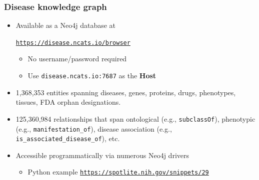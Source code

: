 ﻿\documentclass[anchorcolor=blue,linkcolor=blue]{beamer}
\begin{document}
\begin{frame}
  \frametitle{Disease knowledge graph}
  \begin{itemize}
  \item Available as a Neo4j database at
    
    \centerline{\href{https://disease.ncats.io/browser}{\texttt{https://disease.ncats.io/browser}}}
    \begin{itemize}
    \item No username/password required
    \item Use \texttt{disease.ncats.io:7687} as the \textbf{Host}
    \end{itemize}
  \item 1,368,353 entities spanning diseases, genes, proteins, drugs,
    phenotypes, tissues, FDA orphan designations.
  \item 125,360,984 relationships that span ontological (e.g.,
    \texttt{subclassOf}), phenotypic (e.g.,
    \texttt{manifestation\_of}), disease association (e.g.,
    \texttt{is\_associated\_disease\_of}), etc.
  \item Accessible programmatically via numerous Neo4j drivers
    \begin{itemize}
      \item Python example \href{https://spotlite.nih.gov/snippets/29}{\texttt{https://spotlite.nih.gov/snippets/29}}
    \end{itemize}
  \end{itemize}
\end{frame}
\end{document}
